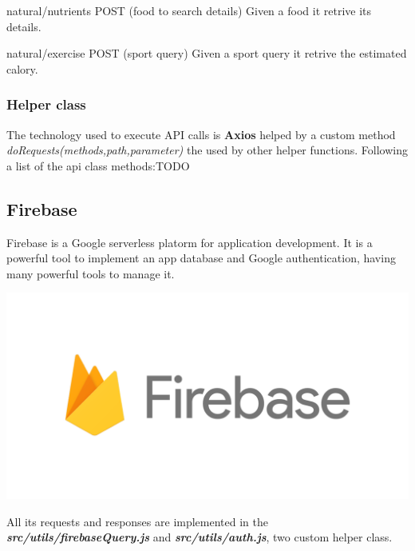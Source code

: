\documentclass[12pt,hidelinks]{article}
\begin{document}
		\begin{docCommand}{natural/nutrients POST (food to search details)}{}
			Given a food it retrive its details.
		\end{docCommand}

		\begin{docCommand}{natural/exercise POST (sport query)}{}
			Given a sport query it retrive the estimated calory.
		\end{docCommand}
	\subsubsection{Helper class}
		The technology used to execute API calls is \textbf{Axios}\cite{Axios} 
		helped by a custom method \textit{doRequests(methods,path,parameter)} the used by other helper functions.
		Following a list of the api class methods:TODO
	\subsection{Firebase}
	    Firebase \cite{Firebase} is a Google serverless platorm for application development. 
        It is a powerful tool to implement an app database and Google authentication, having many powerful tools to manage it.
		\begin{center}
			\includegraphics[scale=0.2]{Firebase}
		\end{center}
		All its requests and responses are implemented in the \textbf{\emph{src/utils/firebaseQuery.js}} and \textbf{\emph{src/utils/auth.js}}, two custom helper class.
		
\newpage
\end{document}
